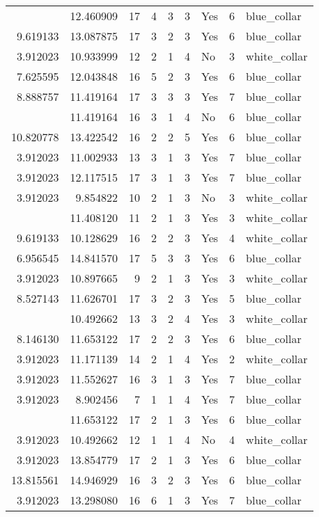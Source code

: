 \documentclass[
]{article}
\begin{document}
\begin{longtable}[t]{rrrrrllrl}
\addlinespace
11.315084 & 12.460909 & 17 & 4 & 3 & 3 & Yes & 6 & blue\_collar\\
9.619133 & 13.087875 & 17 & 3 & 2 & 3 & Yes & 6 & blue\_collar\\
3.912023 & 10.933999 & 12 & 2 & 1 & 4 & No & 3 & white\_collar\\
7.625595 & 12.043848 & 16 & 5 & 2 & 3 & Yes & 6 & blue\_collar\\
8.888757 & 11.419164 & 17 & 3 & 3 & 3 & Yes & 7 & blue\_collar\\
\addlinespace
3.912023 & 11.419164 & 16 & 3 & 1 & 4 & No & 6 & blue\_collar\\
10.820778 & 13.422542 & 16 & 2 & 2 & 5 & Yes & 6 & blue\_collar\\
3.912023 & 11.002933 & 13 & 3 & 1 & 3 & Yes & 7 & blue\_collar\\
3.912023 & 12.117515 & 17 & 3 & 1 & 3 & Yes & 7 & blue\_collar\\
3.912023 & 9.854822 & 10 & 2 & 1 & 3 & No & 3 & white\_collar\\
\addlinespace
3.912023 & 11.408120 & 11 & 2 & 1 & 3 & Yes & 3 & white\_collar\\
9.619133 & 10.128629 & 16 & 2 & 2 & 3 & Yes & 4 & white\_collar\\
6.956545 & 14.841570 & 17 & 5 & 3 & 3 & Yes & 6 & blue\_collar\\
3.912023 & 10.897665 & 9 & 2 & 1 & 3 & Yes & 3 & white\_collar\\
8.527143 & 11.626701 & 17 & 3 & 2 & 3 & Yes & 5 & blue\_collar\\
\addlinespace
4.248495 & 10.492662 & 13 & 3 & 2 & 4 & Yes & 3 & white\_collar\\
8.146130 & 11.653122 & 17 & 2 & 2 & 3 & Yes & 6 & blue\_collar\\
3.912023 & 11.171139 & 14 & 2 & 1 & 4 & Yes & 2 & white\_collar\\
3.912023 & 11.552627 & 16 & 3 & 1 & 3 & Yes & 7 & blue\_collar\\
3.912023 & 8.902456 & 7 & 1 & 1 & 4 & Yes & 7 & blue\_collar\\
\addlinespace
3.912023 & 11.653122 & 17 & 2 & 1 & 3 & Yes & 6 & blue\_collar\\
3.912023 & 10.492662 & 12 & 1 & 1 & 4 & No & 4 & white\_collar\\
3.912023 & 13.854779 & 17 & 2 & 1 & 3 & Yes & 6 & blue\_collar\\
13.815561 & 14.946929 & 16 & 3 & 2 & 3 & Yes & 6 & blue\_collar\\
3.912023 & 13.298080 & 16 & 6 & 1 & 3 & Yes & 7 & blue\_collar\\

\end{longtable}
\end{document}
